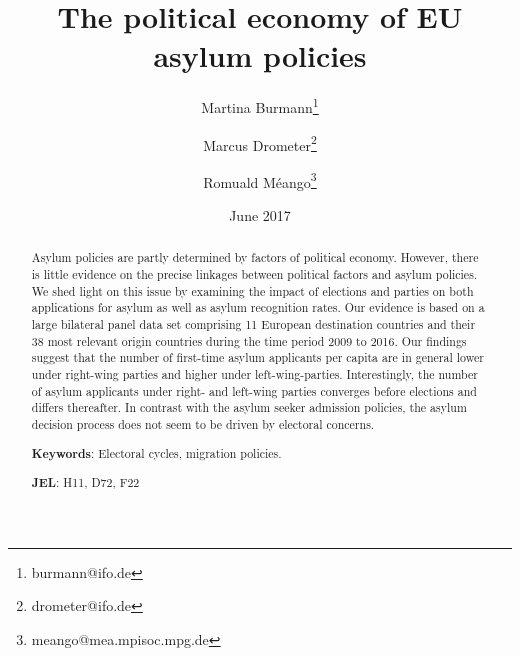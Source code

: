 \documentclass[a4paper,12pt]{article}
\title{The political economy of EU asylum policies}
\date{June 2017}
\author[,1]{Martina Burmann\thanks{burmann@ifo.de}}
\author[,1]{Marcus Drometer\thanks{drometer@ifo.de}}
\author[,2]{Romuald M\'eango\thanks{meango@mea.mpisoc.mpg.de}}
\affil[1]{ifo Institute for Economic Research, Munich}
\affil[2]{Munich Center for the Economics of Aging (MEA)}
\begin{document}
      \maketitle
\begin{abstract}
\singlespacing
\noindent 
Asylum policies are partly determined by factors of political economy. However, there is little evidence on the precise linkages between political factors and asylum policies. We shed light on this issue by examining the impact of elections and parties on both applications for asylum as well as asylum recognition rates. Our evidence is based on a large bilateral panel data set comprising 11 European destination countries and their 38 most relevant origin countries during the time period 2009 to 2016. Our findings suggest that the number of first-time asylum applicants per capita are in general  lower under right-wing parties and higher under left-wing-parties. Interestingly, the number of asylum applicants under right- and left-wing parties converges before elections and differs thereafter. In contrast with the asylum seeker admission policies, the asylum decision process does not seem to be driven by electoral concerns. 
\bigskip

\textbf{Keywords}: Electoral cycles, migration policies.

\textbf{JEL}: H11, D72, F22

\bigskip
\end{abstract}
\setcounter{page}{0} \renewcommand{\thepage}{}
\pagebreak{}\pagebreak

\end{document}
